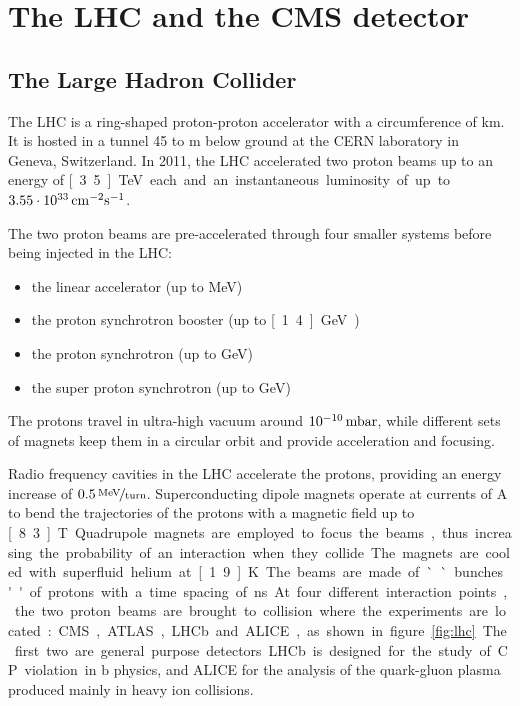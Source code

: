 \chapter{The LHC and the CMS detector}
\section{The Large Hadron Collider}
The LHC is a ring-shaped proton-proton accelerator with a circumference of
\unit[27]{km}. It is hosted in a tunnel 45 to \unit[170]{m} below ground at
the CERN laboratory in Geneva, Switzerland. In 2011, the LHC accelerated two
proton beams up to an energy of \unit[3.5]{TeV} each and an instantaneous
luminosity of up to $\unit[3.55\cdot 10^{33}]{cm^{-2}s^{-1}}$.

The two proton beams are pre-accelerated through four smaller systems before
being injected in the LHC:
\begin{itemize}
    \item the linear accelerator (up to \unit[50]{MeV})
    \item the proton synchrotron booster (up to \unit[1.4]{GeV})
    \item the proton synchrotron (up to \unit[26]{GeV})
    \item the super proton synchrotron (up to \unit[450]{GeV})
\end{itemize}

The protons travel in ultra-high vacuum around
$\unit[10^{-10}]{mbar}$, while different sets of magnets keep them in a
circular orbit and provide acceleration and focusing.

Radio frequency cavities in the LHC accelerate the protons, providing an energy
increase of $\unitfrac[0.5]{MeV}{turn}$.
Superconducting dipole magnets operate at currents of \unit[11850]{A} to bend the trajectories
of the protons with a magnetic field up to \unit[8.3]{T}.
Quadrupole magnets are employed to focus the beams, thus increasing the
probability of an interaction when they collide.
The magnets are cooled with superfluid helium at \unit[1.9]{K}.
The beams are made of ``bunches'' of protons with a time spacing of
\unit[75]{ns}.

At four different interaction points, the two proton beams are brought to
collision where the experiments are located: CMS, ATLAS, LHCb and ALICE, as
shown in figure~\ref{fig:lhc}.
The first two are general purpose detectors. LHCb is designed for the study
of CP violation in $\mathrm{b}$ physics, and ALICE for the analysis of the
quark-gluon plasma produced mainly in heavy ion collisions.

